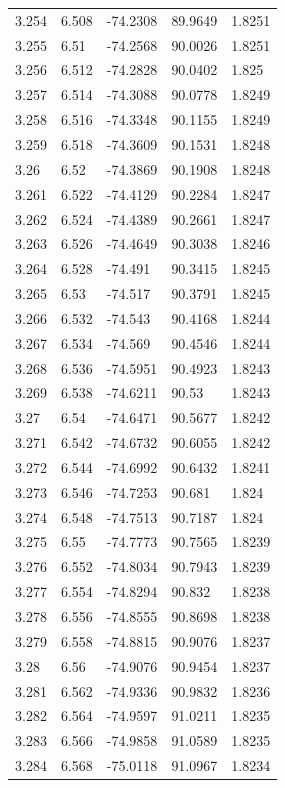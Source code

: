 \begin{tabular}{lllll}
3.254 & 6.508 & -74.2308 & 89.9649 & 1.8251 \\
3.255 & 6.51 & -74.2568 & 90.0026 & 1.8251 \\
3.256 & 6.512 & -74.2828 & 90.0402 & 1.825 \\
3.257 & 6.514 & -74.3088 & 90.0778 & 1.8249 \\
3.258 & 6.516 & -74.3348 & 90.1155 & 1.8249 \\
3.259 & 6.518 & -74.3609 & 90.1531 & 1.8248 \\
3.26 & 6.52 & -74.3869 & 90.1908 & 1.8248 \\
3.261 & 6.522 & -74.4129 & 90.2284 & 1.8247 \\
3.262 & 6.524 & -74.4389 & 90.2661 & 1.8247 \\
3.263 & 6.526 & -74.4649 & 90.3038 & 1.8246 \\
3.264 & 6.528 & -74.491 & 90.3415 & 1.8245 \\
3.265 & 6.53 & -74.517 & 90.3791 & 1.8245 \\
3.266 & 6.532 & -74.543 & 90.4168 & 1.8244 \\
3.267 & 6.534 & -74.569 & 90.4546 & 1.8244 \\
3.268 & 6.536 & -74.5951 & 90.4923 & 1.8243 \\
3.269 & 6.538 & -74.6211 & 90.53 & 1.8243 \\
3.27 & 6.54 & -74.6471 & 90.5677 & 1.8242 \\
3.271 & 6.542 & -74.6732 & 90.6055 & 1.8242 \\
3.272 & 6.544 & -74.6992 & 90.6432 & 1.8241 \\
3.273 & 6.546 & -74.7253 & 90.681 & 1.824 \\
3.274 & 6.548 & -74.7513 & 90.7187 & 1.824 \\
3.275 & 6.55 & -74.7773 & 90.7565 & 1.8239 \\
3.276 & 6.552 & -74.8034 & 90.7943 & 1.8239 \\
3.277 & 6.554 & -74.8294 & 90.832 & 1.8238 \\
3.278 & 6.556 & -74.8555 & 90.8698 & 1.8238 \\
3.279 & 6.558 & -74.8815 & 90.9076 & 1.8237 \\
3.28 & 6.56 & -74.9076 & 90.9454 & 1.8237 \\
3.281 & 6.562 & -74.9336 & 90.9832 & 1.8236 \\
3.282 & 6.564 & -74.9597 & 91.0211 & 1.8235 \\
3.283 & 6.566 & -74.9858 & 91.0589 & 1.8235 \\
3.284 & 6.568 & -75.0118 & 91.0967 & 1.8234 \\

\end{tabular}
